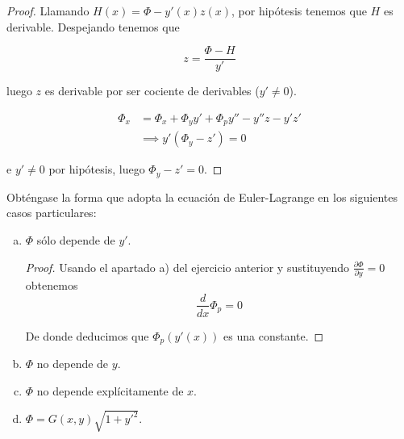 \begin{ejercicio}
\begin{proof}
        Llamando $H(x) = \Phi-y'(x)z(x)$, por hipótesis tenemos que
        $H$ es derivable. Despejando tenemos que

        \[
          z = \frac{\Phi-H}{y'}
        \]

        luego $z$ es derivable por ser cociente de derivables ($y'\neq 0$).

        \begin{align*}
          \Phi_x & = \Phi_x + \Phi_yy' + \Phi_py'' - y''z -y'z' \\
                 & \implies y'(\Phi_y-z') = 0
        \end{align*}

        e $y' \neq 0$ por hipótesis, luego $\Phi_y - z' = 0$.
  \end{proof}
\end{ejercicio}
\begin{ejercicio}
Obténgase la forma que adopta la ecuación de Euler-Lagrange en los siguientes casos particulares:

\begin{enumerate}[a)]
\item $\Phi$ sólo depende de $y'$.
    \begin{proof}
      Usando el apartado a) del ejercicio anterior y sustituyendo $\frac{\partial\Phi}{\partial y}=0$ obtenemos
      \[
        \frac{d}{dx}\Phi_p = 0
      \]

      De donde deducimos que $\Phi_p(y'(x))$ es una constante.
    \end{proof}
\item $\Phi$ no depende de $y$.
\item $\Phi$ no depende explícitamente de $x$.
\item $\Phi=G(x,y)\sqrt{1+y'^2}$.
\end{enumerate}
\end{ejercicio}


